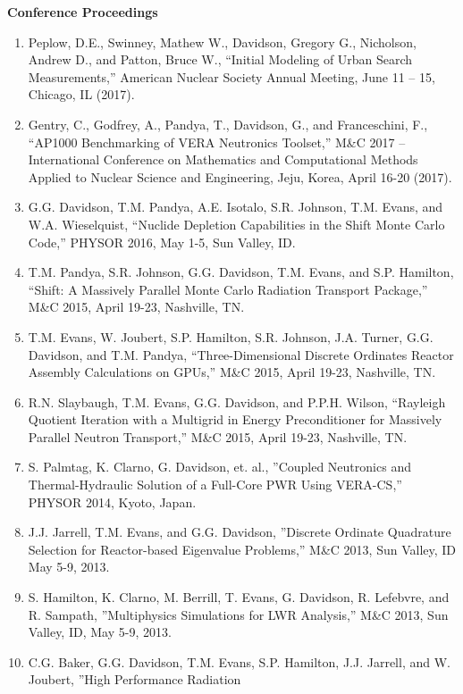 \documentclass[letterpaper,11pt]{article}
\newcommand{\leftsubheading}[1]{
  \textbf{#1\vspace{-6pt} \\}}
\begin{document}
\leftsubheading{Conference Proceedings}
\begin{enumerate}
  \item Peplow, D.E., Swinney, Mathew W., Davidson, Gregory G.,
    Nicholson, Andrew D., and Patton, Bruce W., ``Initial Modeling of
    Urban Search Measurements,'' American Nuclear Society Annual
    Meeting, June 11 – 15, Chicago, IL (2017).
  \item Gentry, C., Godfrey, A., Pandya, T., Davidson, G., and
    Franceschini, F., ``AP1000 Benchmarking of VERA Neutronics
    Toolset,'' M\&C 2017 – International Conference on Mathematics and
    Computational Methods Applied to Nuclear Science and Engineering,
    Jeju, Korea, April 16-20 (2017).
  \item G.G. Davidson, T.M. Pandya, A.E. Isotalo, S.R. Johnson,
    T.M. Evans, and W.A. Wieselquist, ``Nuclide Depletion Capabilities
    in the Shift Monte Carlo Code,'' PHYSOR 2016, May 1-5, Sun Valley,
    ID.
  \item T.M. Pandya, S.R. Johnson, G.G. Davidson, T.M. Evans, and
    S.P. Hamilton, ``Shift: A Massively Parallel Monte Carlo Radiation
    Transport Package,'' M\&C 2015, April 19-23, Nashville, TN.
  \item T.M. Evans, W. Joubert, S.P. Hamilton, S.R. Johnson,
    J.A. Turner, G.G. Davidson, and T.M. Pandya, ``Three-Dimensional
    Discrete Ordinates Reactor Assembly Calculations on GPUs,'' M\&C
    2015, April 19-23, Nashville, TN.
  \item R.N. Slaybaugh, T.M. Evans, G.G. Davidson, and P.P.H. Wilson,
    ``Rayleigh Quotient Iteration with a Multigrid in Energy
    Preconditioner for Massively Parallel Neutron Transport,'' M\&C
    2015, April 19-23, Nashville, TN.
  \item S. Palmtag, K. Clarno, G. Davidson, et. al., ''Coupled
    Neutronics and Thermal-Hydraulic Solution of a Full-Core PWR Using
    VERA-CS,'' PHYSOR 2014, Kyoto, Japan.
  \item J.J. Jarrell, T.M. Evans, and G.G. Davidson, ''Discrete
    Ordinate Quadrature Selection for Reactor-based Eigenvalue
    Problems,'' M\&C 2013, Sun Valley, ID May 5-9, 2013.
  \item S. Hamilton, K. Clarno, M. Berrill, T. Evans, G. Davidson,
    R. Lefebvre, and R. Sampath, ''Multiphysics Simulations for LWR
    Analysis,'' M\&C 2013, Sun Valley, ID, May 5-9, 2013.
  \item C.G. Baker, G.G. Davidson, T.M. Evans, S.P. Hamilton,
    J.J. Jarrell, and W. Joubert, ''High Performance Radiation

\end{enumerate}
\end{document}
